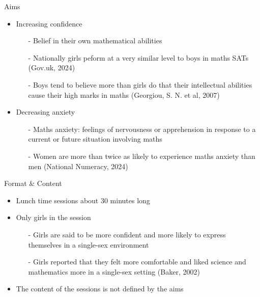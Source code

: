 \documentclass{beamer}  %
\begin{document}
\begin{frame}{Aims}
    \begin{itemize}
        \item Increasing confidence
        \begin{itemize}
            \item[-] Belief in their own mathematical abilities
            \item[-]Nationally girls peform at a very similar level to boys in maths SATs (Gov.uk, 2024)
            \item[-] Boys tend to believe more than girls do that their intellectual abilities cause their high marks in maths (Georgiou, S. N. et al, 2007)
        \end{itemize}
        \item Decreasing anxiety
        \begin{itemize}
            \item[-] Maths anxiety: feelings of nervousness or apprehension in response to a current or future  situation involving maths 
            \item[-]Women are more than twice as likely to experience maths anxiety than men (National Numeracy, 2024) 
        \end{itemize}
    \end{itemize}
\end{frame}


\begin{frame}{Format \& Content}
    \begin{itemize}
        \item Lunch time sessions about 30 minutes long
        \item Only girls in the session
        \begin{itemize}
            \item[-] Girls are said to be more confident and more likely to express themselves in a single-sex environment
            \item[-] Girls reported that they felt more comfortable and liked science and mathematics more
            in a single-sex setting (Baker, 2002)
        \end{itemize}
        \item The content of the sessions is not defined by the aims
    \end{itemize}
\end{frame}

\end{document}
